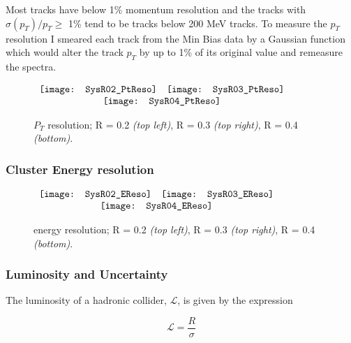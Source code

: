 Most tracks have below 1\% momentum resolution and the tracks with $\sigma(p_{T})/p_{T} \geq$ 1\% tend to be tracks below 200 MeV tracks.  To measure the $p_{T}$ resolution I smeared each track from the Min Bias data by a Gaussian function which would alter the track $p_{T}$ by up to 1\% of its original value and remeasure the spectra.  

\begin{figure*}[t!]
$\begin{array}{rl}
    \texttt{[image: SysR02\_PtReso]} &
    \texttt{[image: SysR03\_PtReso]}\\
    \multicolumn{2}{c}{\texttt{[image: SysR04\_PtReso]}}
\end{array}$
\caption[Systematic due to $P_{T}$ resolution.]{\label{fig:pTeff}$P_{T}$ resolution; R = 0.2 \textit{(top left)}, R = 0.3 \textit{(top right)}, R = 0.4 \textit{(bottom)}.}
\end{figure*}


\subsubsection{Cluster Energy resolution}

\begin{figure*}[t!]
$\begin{array}{rl}
    \texttt{[image: SysR02\_EReso]} &
    \texttt{[image: SysR03\_EReso]}\\
    \multicolumn{2}{c}{\texttt{[image: SysR04\_EReso]}}
\end{array}$
\caption[Systematic due to energy resolution.]{\label{fig:pTeff}energy resolution; R = 0.2 \textit{(top left)}, R = 0.3 \textit{(top right)}, R = 0.4 \textit{(bottom)}.}
\end{figure*}

\subsubsection{Luminosity and Uncertainty}

The luminosity of a hadronic collider, $\mathscr{L}$, is given by the expression



\begin{equation}
\mathscr{L} = \frac{R}{\sigma}
\label{eq:xlumdef}
\end{equation}

